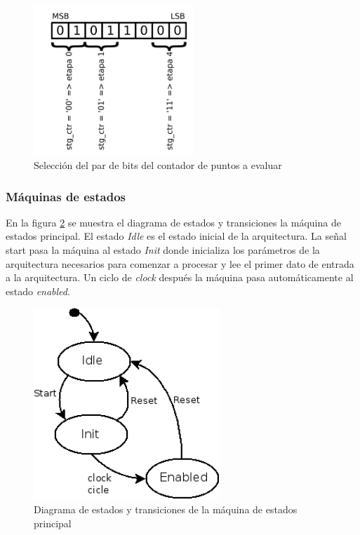 \begin{figure}[htb!]
        \centering
        \includegraphics[width=6cm]{./figures/r4conts.png}
        \caption{Selección del par de bits del contador de puntos a evaluar}
        \label{fig:r4conts}
\end{figure}

\subsubsection{Máquinas de estados}

En la figura \ref{fig:r4statep} se muestra el diagrama de estados y transiciones la máquina de
estados principal.
El estado
\textit{Idle} es el estado inicial de la arquitectura. La señal start pasa la máquina al estado \textit{Init}
donde inicializa los parámetros de la arquitectura necesarios para comenzar a procesar y lee el
primer dato de entrada a la arquitectura. Un ciclo de \textit{clock} después la máquina pasa
automáticamente al estado \textit{enabled}.

\begin{figure}[htb!]
        \centering
        \includegraphics[width=7cm]{./figures/SMr2gen.png}
        \caption{Diagrama de estados y transiciones de la máquina de estados principal}
        \label{fig:r4statep}
\end{figure}

